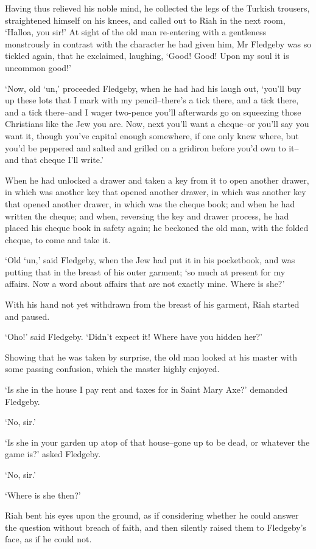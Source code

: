 Having thus relieved his noble mind, he collected the legs of the
Turkish trousers, straightened himself on his knees, and called out
to Riah in the next room, ‘Halloa, you sir!’ At sight of the old man
re-entering with a gentleness monstrously in contrast with the character
he had given him, Mr Fledgeby was so tickled again, that he exclaimed,
laughing, ‘Good! Good! Upon my soul it is uncommon good!’

‘Now, old ‘un,’ proceeded Fledgeby, when he had had his laugh out,
‘you’ll buy up these lots that I mark with my pencil--there’s a tick
there, and a tick there, and a tick there--and I wager two-pence you’ll
afterwards go on squeezing those Christians like the Jew you are. Now,
next you’ll want a cheque--or you’ll say you want it, though you’ve
capital enough somewhere, if one only knew where, but you’d be peppered
and salted and grilled on a gridiron before you’d own to it--and that
cheque I’ll write.’

When he had unlocked a drawer and taken a key from it to open another
drawer, in which was another key that opened another drawer, in which
was another key that opened another drawer, in which was the cheque
book; and when he had written the cheque; and when, reversing the key
and drawer process, he had placed his cheque book in safety again; he
beckoned the old man, with the folded cheque, to come and take it.

‘Old ‘un,’ said Fledgeby, when the Jew had put it in his pocketbook, and
was putting that in the breast of his outer garment; ‘so much at present
for my affairs. Now a word about affairs that are not exactly mine.
Where is she?’

With his hand not yet withdrawn from the breast of his garment, Riah
started and paused.

‘Oho!’ said Fledgeby. ‘Didn’t expect it! Where have you hidden her?’

Showing that he was taken by surprise, the old man looked at his master
with some passing confusion, which the master highly enjoyed.

‘Is she in the house I pay rent and taxes for in Saint Mary Axe?’
demanded Fledgeby.

‘No, sir.’

‘Is she in your garden up atop of that house--gone up to be dead, or
whatever the game is?’ asked Fledgeby.

‘No, sir.’

‘Where is she then?’

Riah bent his eyes upon the ground, as if considering whether he could
answer the question without breach of faith, and then silently raised
them to Fledgeby’s face, as if he could not.

